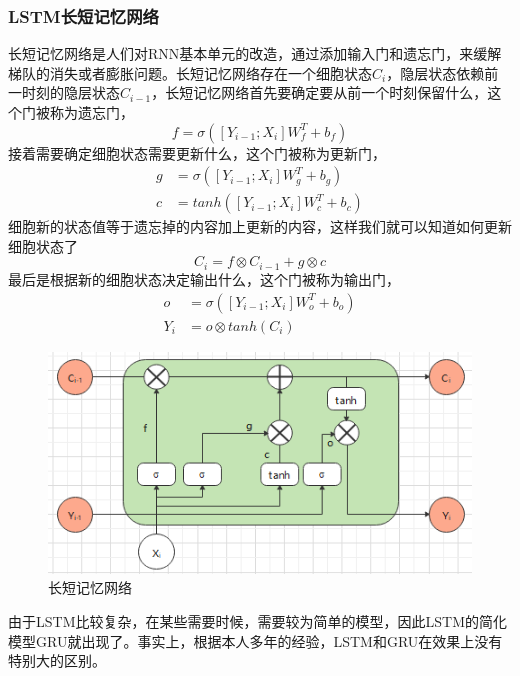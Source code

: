 \documentclass[twoside,a4paper,12pt]{book}%
\begin{document}
\subsubsection{LSTM长短记忆网络}
长短记忆网络是人们对\gls{RNN}基本单元的改造，通过添加输入门和遗忘门，来缓解梯队的消失或者膨胀问题。长短记忆网络存在一个细胞状态$C_i$，隐层状态依赖前一时刻的隐层状态$C_{i-1}$，长短记忆网络首先要确定要从前一个时刻保留什么，这个门被称为遗忘门，
$$
f=\sigma([Y_{i-1};X_i]W_f^T+b_f)
$$
接着需要确定细胞状态需要更新什么，这个门被称为更新门，
$$
\begin{aligned}
g&=\sigma([Y_{i-1};X_i]W_g^T+b_g)\\
c&=tanh([Y_{i-1};X_i]W_c^T+b_c)
\end{aligned}
$$
细胞新的状态值等于遗忘掉的内容加上更新的内容，这样我们就可以知道如何更新细胞状态了
$$
C_{i}=f\otimes C_{i-1} + g \otimes c
$$
最后是根据新的细胞状态决定输出什么，这个门被称为输出门，
$$
\begin{aligned}
o&=\sigma([Y_{i-1};X_i]W_o^T+b_o) \\
Y_{i}&=o\otimes tanh(C_i)
\end{aligned}
$$
\begin{figure}[htbp]
\begin{center}
\includegraphics[width=5.5in]{figures/lstm1.png}
\caption{长短记忆网络}
\label{fig:lstm1}
\end{center}
\end{figure}
由于\gls{LSTM}比较复杂，在某些需要时候，需要较为简单的模型，因此\gls{LSTM}的简化模型\gls{GRU}就出现了。事实上，根据本人多年的经验，\gls{LSTM}和\gls{GRU}在效果上没有特别大的区别。
\end{document}
